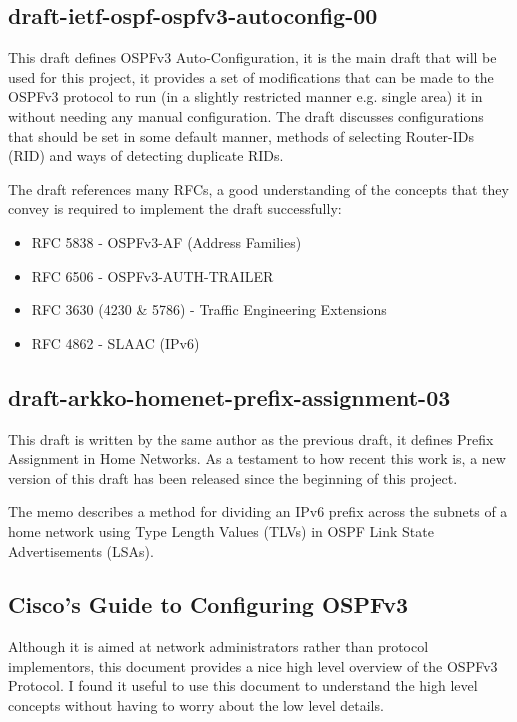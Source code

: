 \documentclass[12pt]{report}
\begin{document}
\subsection{draft-ietf-ospf-ospfv3-autoconfig-00} 
This draft defines OSPFv3 Auto-Configuration, it is the main draft that will be
used for this project, it provides a set of modifications that can be made to
the OSPFv3 protocol to run (in a slightly restricted manner e.g.  single area)
it in without needing any manual configuration.  The draft discusses
configurations that should be set in some default manner, methods of selecting
Router-IDs (RID) and ways of detecting duplicate RIDs. 

The draft references many RFCs, a good understanding of the concepts 
that they convey is required to implement the draft successfully:

\begin{itemize}
	\item RFC 5838 - OSPFv3-AF (Address Families)
	\item RFC 6506 - OSPFv3-AUTH-TRAILER
	\item RFC 3630 (4230 \& 5786) - Traffic Engineering Extensions 
	\item RFC 4862 - SLAAC (IPv6) 
\end{itemize}


\subsection{draft-arkko-homenet-prefix-assignment-03}
 		
This draft is written by the same author as the previous draft, it defines
Prefix Assignment in Home Networks. As a testament to how recent this work is, a
new version of this draft has been released since the beginning of this project. 

The memo describes a method for dividing an IPv6 prefix across the subnets of a
home network using Type Length Values (TLVs) in OSPF Link State Advertisements
(LSAs).

\subsection{Cisco's Guide to Configuring OSPFv3}

Although it is aimed at network administrators rather than protocol
implementors, this document provides a nice high level overview of the OSPFv3
Protocol. I found it useful to use this document to understand the high level
concepts without having to worry about the low level details.
\end{document}
